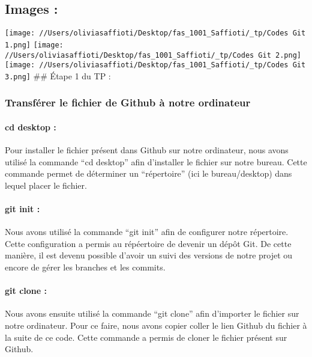 \documentclass[
  letterpaper,
  DIV=11,
  numbers=noendperiod]{scrartcl}
\let\oldparagraph\paragraph
\renewcommand{\paragraph}[1]{\oldparagraph{#1}\mbox{}}
\begin{document}
\hypertarget{images}{%
\subsection{Images :}\label{images}}

\texttt{[image: //Users/oliviasaffioti/Desktop/fas\_1001\_Saffioti/\_tp/Codes Git 1.png]}
\texttt{[image: //Users/oliviasaffioti/Desktop/fas\_1001\_Saffioti/\_tp/Codes Git 2.png]}
\texttt{[image: //Users/oliviasaffioti/Desktop/fas\_1001\_Saffioti/\_tp/Codes Git 3.png]}
\#\# Étape 1 du TP :

\hypertarget{transfuxe9rer-le-fichier-de-github-uxe0-notre-ordinateur}{%
\subsubsection{Transférer le fichier de Github à notre
ordinateur}\label{transfuxe9rer-le-fichier-de-github-uxe0-notre-ordinateur}}

\hypertarget{cd-desktop}{%
\paragraph{cd desktop :}\label{cd-desktop}}

Pour installer le fichier présent dans Github sur notre ordinateur, nous
avons utilisé la commande ``cd desktop'' afin d'installer le fichier sur
notre bureau. Cette commande permet de déterminer un ``répertoire'' (ici
le bureau/desktop) dans lequel placer le fichier.

\hypertarget{git-init}{%
\paragraph{git init :}\label{git-init}}

Nous avons utilisé la commande ``git init'' afin de configurer notre
répertoire. Cette configuration a permis au répéertoire de devenir un
dépôt Git. De cette manière, il est devenu possible d'avoir un suivi des
versions de notre projet ou encore de gérer les branches et les commits.

\hypertarget{git-clone}{%
\paragraph{git clone :}\label{git-clone}}

Nous avons ensuite utilisé la commande ``git clone'' afin d'importer le
fichier sur notre ordinateur. Pour ce faire, nous avons copier coller le
lien Github du fichier à la suite de ce code. Cette commande a permis de
cloner le fichier présent sur Github.
\end{document}
